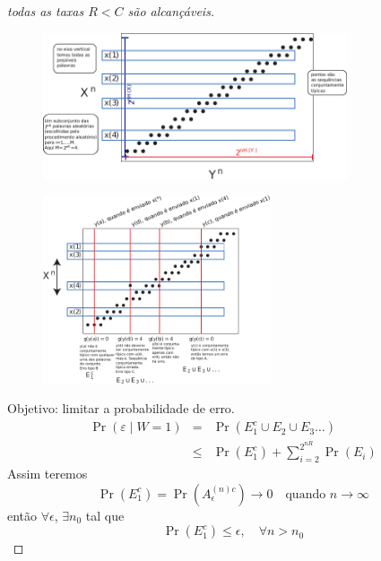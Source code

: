 \begin{frame}[allowframebreaks]
\begin{proof}[todas as taxas $R < C$ são alcançáveis]
  \proofbreak

                \begin{figure}[h!]
                \centering
                \includegraphics[width=0.8\textwidth]{images/mesmap.pdf}
                \label{fig:mesmap}
                \end{figure}

  \proofbreak
		\vspace{-0.25cm}
                \begin{figure}[h!]
                \centering
                \includegraphics[width=0.6\textwidth]{images/codmap.pdf}
                \label{fig:codmap}
                \end{figure}
  \proofbreak
 
  Objetivo: limitar a probabilidade de erro.  
  \begin{eqnarray}
  \Pr(\varepsilon \mid W = 1) &=& \Pr(E_1^c \cup E_2 \cup E_3 \ldots) \nonumber \\
			&\leq& \Pr(E_1^c) + \sum_{i=2}^{2^{nR}} \Pr(E_i) 
  \end{eqnarray}
  Assim teremos
  \begin{equation}
  \Pr(E_1^c) = \Pr(A_{\epsilon}^{(n)c}) \rightarrow 0  \quad \text{quando } n \rightarrow \infty
  \end{equation}
  então $\forall \epsilon$, $\exists n_0$ tal que
  \begin{equation}
  \Pr(E_1^c) \leq \epsilon , \quad \forall n > n_0
  \end{equation}


\end{proof}
\end{frame}
